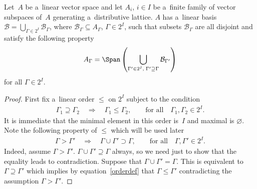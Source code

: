 \begin{lemma}
\label{partlem}
Let~$A$ be a~linear vector space and let $A_i$, $i\in I$ be a~finite family of vector subspaces of~$A$ generating a~distributive lattice.
$A$ has a~linear basis $\mathcal{B}=\bigcup_{\Gamma\in2^I}\mathcal{B}_\Gamma$, where
$\mathcal{B}_\Gamma\subseteq A_\Gamma$, $\Gamma\in2^I$, such that subsets $\mathcal{B}_\Gamma$ are all disjoint and
satisfy the following property
\begin{gather}
\label{partition}
A_\Gamma=\Span\left(\bigcup_{\Gamma'\in2^I,\; \Gamma'\supseteq\Gamma}\mathcal{B}_{\Gamma'}\right)  %
\end{gather}
for all $\Gamma\in2^I$.
\end{lemma}
\begin{proof}
First f\/ix a~linear order $\leq$ on $2^I$ subject to the condition
\begin{gather}
\label{orderdef}
\Gamma_1\supseteq \Gamma_2
\quad
\Rightarrow
\quad
\Gamma_1\leq\Gamma_2,
\qquad
\text{for all}
\quad
\Gamma_1,\Gamma_2\in 2^I.
\end{gather}
It is immediate that the minimal element in this order is~$I$ and maximal is $\varnothing$.
Note the following property of $\leq$ which will be used later
\begin{gather}
\label{Order}
\Gamma>\Gamma'
\quad
\Rightarrow
\quad
\Gamma\cup\Gamma'\supset \Gamma,
\qquad
\text{for all}
\quad
\Gamma,\Gamma'\in2^I.
\end{gather}
Indeed, assume $\Gamma>\Gamma'$.
$\Gamma\cup\Gamma'\supseteq \Gamma$ always, so we need just to show that the equality leads to contradiction.
Suppose that $\Gamma\cup\Gamma'= \Gamma$.
This is equivalent to $\Gamma\supseteq\Gamma'$ which implies by equation~\eqref{orderdef} that $\Gamma\leq\Gamma'$
contradicting the assumption $\Gamma>\Gamma'$.


\end{proof}
